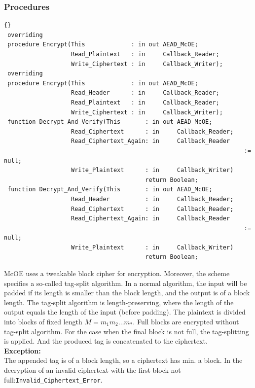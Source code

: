 \subsubsection*{Procedures}
\begin{lstlisting}{}
 overriding
 procedure Encrypt(This             : in out AEAD_McOE;
                   Read_Plaintext   : in     Callback_Reader;
                   Write_Ciphertext : in     Callback_Writer);
 overriding
 procedure Encrypt(This             : in out AEAD_McOE;
                   Read_Header      : in     Callback_Reader;
                   Read_Plaintext   : in     Callback_Reader;
                   Write_Ciphertext : in     Callback_Writer);
 function Decrypt_And_Verify(This       : in out AEAD_McOE;
                   Read_Ciphertext      : in     Callback_Reader;
                   Read_Ciphertext_Again: in     Callback_Reader
                   													:= null;
                   Write_Plaintext      : in     Callback_Writer)
                               			return Boolean;
 function Decrypt_And_Verify(This       : in out AEAD_McOE;
                   Read_Header          : in     Callback_Reader;
                   Read_Ciphertext      : in     Callback_Reader;
                   Read_Ciphertext_Again: in     Callback_Reader 
                   													:= null;
                   Write_Plaintext      : in     Callback_Writer)
                               			return Boolean;
\end{lstlisting}
McOE uses a tweakable block cipher for encryption. Moreover, the
scheme specifies a so-called tag-split algorithm. In a normal
algorithm, the input will be padded if its length is smaller than the
block length, and the output is of a block length. The tag-split
algorithm is length-preserving, where the length of the output equals
the length of the input (before padding). The plaintext is divided
into blocks of fixed length $M=m_1m_2 \ldots m_{*}$. Full blocks are
encrypted without tag-split algorithm. For the case when the final
block is not full, the tag-splitting is applied. And the produced tag
is concatenated to the ciphertext.\\

\noindent\textbf{Exception:}\\ The appended tag is of a block length,
so a ciphertext has min. a block.  In the decryption of an invalid
ciphertext with the first block not
full:\quad\texttt{Invalid\_Ciphertext\_Error}.


